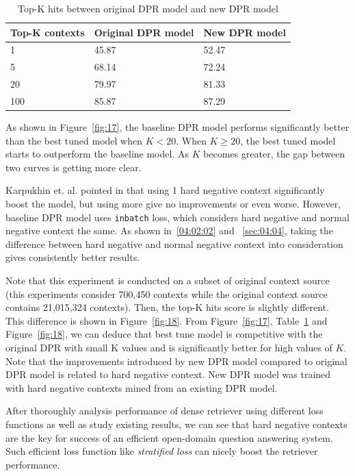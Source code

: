 \documentclass[3p, sort&compress, 12pt]{elsarticle}
\begin{document}
\begin{table}
	\caption{Top-K hits between original DPR model and new DPR model}
	\label{tab:04}
	\centering
	\begin{tabular}{lll}
		\hline
		Top-K contexts & Original DPR model & New DPR model \\\hline
		1 & 45.87 & 52.47 \\\hline
		5 & 68.14 & 72.24 \\\hline
		20 & 79.97 & 81.33 \\\hline
		100 & 85.87 & 87.29 \\\hline
	\end{tabular}
\end{table}
\par As shown in Figure~\ref{fig:17}, the baseline DPR model performs significantly better than the best tuned model when $K < 20$. When $K \geq 20$, the best tuned model starts to outperform the baseline model. As $K$ becomes greater, the gap between two curves is getting more clear.
\par Karpukhin et. al. pointed in \cite{karpukhin2020dense} that using 1 hard negative context significantly boost the model, but using more give no improvements or even worse. However, baseline DPR model uses {\tt inbatch} loss, which considers hard negative and normal negative context the same. As shown in~\ref{04:02:02} and ~\ref{sec:04:04}, taking the difference between hard negative and normal negative context into consideration gives consistently better results.
\par Note that this experiment is conducted on a subset of original context source (this experiments consider 700,450 contexts while the original context source contains 21,015,324 contexts). Then, the top-K hits score is slightly different. This difference is shown in Figure~\ref{fig:18}. From Figure~\ref{fig:17}, Table~\ref{tab:04} and Figure~\ref{fig:18}, we can deduce that best tune model is competitive with the original DPR with small K values and is significantly better for high values of $K$. Note that the improvements introduced by new DPR model compared to original DPR model is related to hard negative context. New DPR model was trained with hard negative contexts mined from an existing DPR model.
\par After thoroughly analysis performance of dense retriever using different loss functions as well as study existing results, we can see that hard negative contexts are the key for success of an efficient open-domain question answering system. Such efficient loss function like \textit{stratified loss} can nicely boost the retriever performance.
\end{document}
